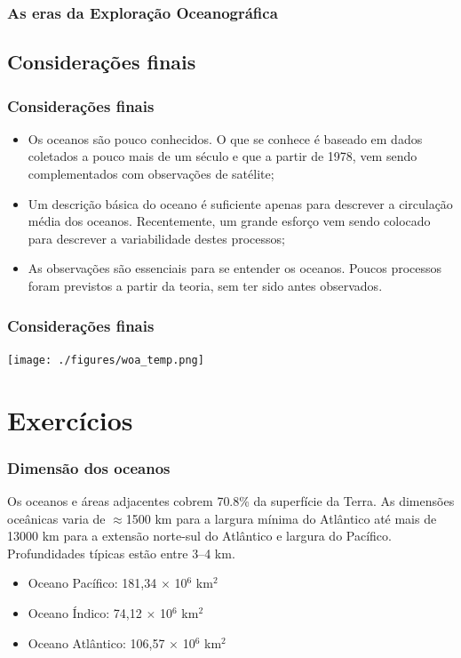 \begin{frame}
    \frametitle{As eras da Exploração Oceanográfica}
    \centerline{}
\end{frame}

\subsection{Considerações finais}
\begin{frame}
    \frametitle{Considerações finais}
\small{
    \begin{itemize}[<+-| alert@+>]
        \item Os oceanos são pouco conhecidos.  O que se conhece é baseado em
              dados coletados a pouco mais de um século e que a partir de 1978,
              vem sendo complementados com observações de satélite;
        \item Um descrição básica do oceano é suficiente apenas para descrever
              a circulação média dos oceanos.  Recentemente, um grande esforço
              vem sendo colocado para descrever a variabilidade destes processos;
        \item As observações são essenciais para se entender os oceanos.
              Poucos processos foram previstos a partir da teoria, sem ter sido antes observados.
    \end{itemize}
}
\end{frame}

\begin{frame}
    \frametitle{Considerações finais}
    \centerline{\texttt{[image: ./figures/woa\_temp.png]}}
\end{frame}

\section{Exercícios}
\begin{frame}
    \frametitle{Dimensão dos oceanos}

    \small{Os oceanos e áreas adjacentes cobrem 70.8\% da superfície da Terra.
    As dimensões oceânicas varia de $\approx$1500 km para a largura mínima do
    Atlântico até mais de 13000 km para a extensão norte-sul do Atlântico e
    largura do Pacífico.  Profundidades típicas estão entre 3--4 km.}

    \begin{itemize}[<+-| alert@+>]
        \item Oceano Pacífico: 181,34 $\times$ 10$^6$ km$^2$
        \item Oceano Índico: 74,12 $\times$ 10$^6$ km$^2$
        \item Oceano Atlântico: 106,57 $\times$ 10$^6$ km$^2$
    \end{itemize}
\end{frame}


